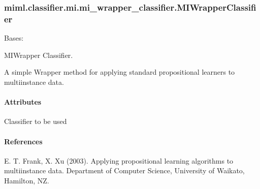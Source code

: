 \documentclass[letterpaper,10pt,english]{sphinxmanual}
\begin{document}
\sphinxstepscope


\subsubsection{miml.classifier.mi.mi\_wrapper\_classifier.MIWrapperClassifier}
\label{\detokenize{classifier/mi/_autosummary/miml.classifier.mi.mi_wrapper_classifier.MIWrapperClassifier:miml-classifier-mi-mi-wrapper-classifier-miwrapperclassifier}}\label{\detokenize{classifier/mi/_autosummary/miml.classifier.mi.mi_wrapper_classifier.MIWrapperClassifier::doc}}

\begin{fulllineitems}
\label{\detokenize{classifier/mi/_autosummary/miml.classifier.mi.mi_wrapper_classifier.MIWrapperClassifier:miml.classifier.mi.mi_wrapper_classifier.MIWrapperClassifier}}
\pysigstartsignatures
{}
\pysigstopsignatures
\sphinxAtStartPar
Bases: 

\sphinxAtStartPar
MIWrapper Classifier.

\sphinxAtStartPar
A simple Wrapper method for applying standard propositional learners to multi\sphinxhyphen{}instance data.


\paragraph{Attributes}
\label{\detokenize{classifier/mi/_autosummary/miml.classifier.mi.mi_wrapper_classifier.MIWrapperClassifier:attributes}}\begin{description}
\sphinxAtStartPar
Classifier to be used

\end{description}


\paragraph{References}
\label{\detokenize{classifier/mi/_autosummary/miml.classifier.mi.mi_wrapper_classifier.MIWrapperClassifier:references}}
\sphinxAtStartPar
E. T. Frank, X. Xu (2003). Applying propositional learning algorithms to multi\sphinxhyphen{}instance data. Department of Computer
Science, University of Waikato, Hamilton, NZ.


\end{fulllineitems}
\end{document}
